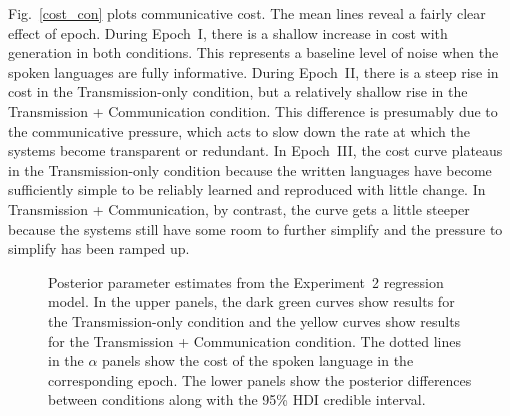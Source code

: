 \documentclass[doc,biblatex]{apa7}
\begin{document}
Fig.~\ref{cost_con} plots communicative cost. The mean lines reveal a fairly clear effect of epoch. During Epoch~I, there is a shallow increase in cost with generation in both conditions. This represents a baseline level of noise when the spoken languages are fully informative. During Epoch~II, there is a steep rise in cost in the Transmission-only condition, but a relatively shallow rise in the Transmission + Communication condition. This difference is presumably due to the communicative pressure, which acts to slow down the rate at which the systems become transparent or redundant. In Epoch~III, the cost curve plateaus in the Transmission-only condition because the written languages have become sufficiently simple to be reliably learned and reproduced with little change. In Transmission + Communication, by contrast, the curve gets a little steeper because the systems still have some room to further simplify and the pressure to simplify has been ramped up.

	\begin{figure}
	\vspace*{2pt}
	\caption{Posterior parameter estimates from the Experiment~2 regression model. In the upper panels, the dark green curves show results for the Transmission-only condition and the yellow curves show results for the Transmission + Communication condition. The dotted lines in the $\alpha$ panels show the cost of the spoken language in the corresponding epoch. The lower panels show the posterior differences between conditions along with the 95\% HDI credible interval.}
	\label{posterior_con}
	\end{figure}
\end{document}
